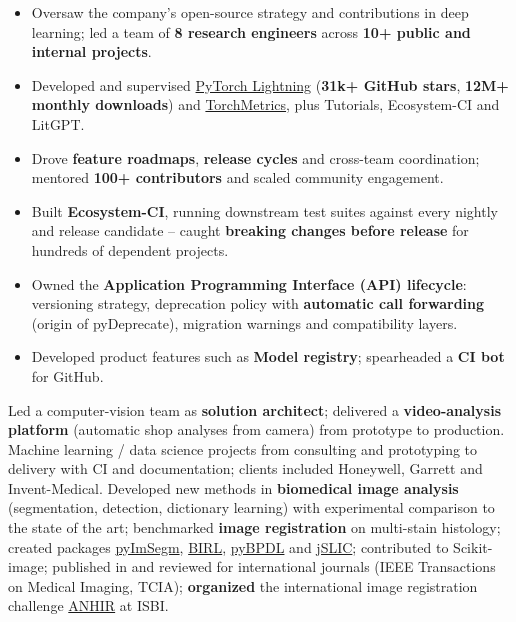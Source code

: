 \documentclass[10pt,a4paper,sans]{moderncv}
\begin{document}
{
	\begin{itemize}
		\item Oversaw the company's open-source strategy and contributions in deep learning; led a team of \textbf{8 research engineers} across \textbf{10+ public and internal projects}.
		\item Developed and supervised \href{https://github.com/Lightning-AI/pytorch-lightning}{PyTorch Lightning} (\textbf{31k+ GitHub stars}, \textbf{12M+ monthly downloads}) and \href{https://github.com/Lightning-AI/torchmetrics}{TorchMetrics}, plus Tutorials, Ecosystem-CI and LitGPT.
		\item Drove \textbf{feature roadmaps}, \textbf{release cycles} and cross-team coordination; mentored \textbf{100+ contributors} and scaled community engagement.
		\item Built \textbf{Ecosystem-CI}, running downstream test suites against every nightly and release candidate -- caught \textbf{breaking changes before release} for hundreds of dependent projects.
		\item Owned the \textbf{Application Programming Interface (API) lifecycle}: versioning strategy, deprecation policy with \textbf{automatic call forwarding} (origin of pyDeprecate), migration warnings and compatibility layers.
		\item Developed product features such as \textbf{Model registry}; spearheaded a \textbf{CI bot} for GitHub.
	\end{itemize}
}
{Led a computer-vision team as \textbf{solution architect}; delivered a \textbf{video-analysis platform} (automatic shop analyses from camera) from prototype to production.
}
{Machine learning / data science projects from consulting and prototyping to delivery with CI and documentation; clients included Honeywell, Garrett and Invent-Medical.
}
{Developed new methods in \textbf{biomedical image analysis} (segmentation, detection, dictionary learning) with experimental comparison to the state of the art; benchmarked \textbf{image registration} on multi-stain histology; created packages \href{https://borda.github.io/pyImSegm}{pyImSegm}, \href{https://borda.github.io/BIRL}{BIRL}, \href{https://borda.github.io/pyBPDL}{pyBPDL} and \href{https://imagej.net/CMP-BIA_tools}{jSLIC}; contributed to Scikit-image; published in and reviewed for international journals (IEEE Transactions on Medical Imaging, TCIA); \textbf{organized} the international image registration challenge \href{https://anhir.grand-challenge.org}{ANHIR} at ISBI.
}
\end{document}
